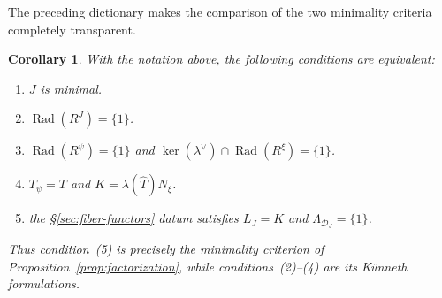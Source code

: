 \documentclass{amsart}
\newtheorem{corollary}[theorem]{Corollary}
\theoremstyle{definition}
\newcommand{\Rad}{\operatorname{Rad}}
\numberwithin{equation}{section}
\begin{document}
The preceding dictionary makes the comparison of the two minimality criteria
completely transparent.

\begin{corollary}
\label{cor:kunneth-equivariantization-minimality}
With the notation above, the following conditions are equivalent:
\begin{enumerate}

\item $J$ is minimal.

\item
$
 \Rad(R^J)=\{1\}$.

\item
$
 \Rad(R^\psi)=\{1\}$ and 
$
 \ker(\lambda^\vee)\cap\Rad(R^\xi)=\{1\}$.

\item
$
 T_\psi=T$ and $K=\lambda(\widehat T)N_\xi$.

\item the \S\ref{sec:fiber-functors} datum satisfies
$
 L_J=K$ and $\Lambda_{\mathcal D_J}=\{1\}$.
\end{enumerate}
Thus condition~(5) is precisely the minimality criterion of
Proposition~\ref{prop:factorization}, while conditions~(2)--(4) are its
K\"unneth formulations.
\end{corollary}
\end{document}
